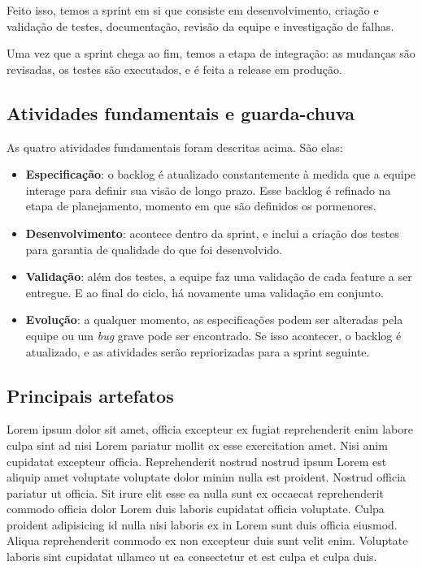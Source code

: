 \documentclass[12pt]{article}
\begin{document}
Feito isso, temos a sprint em si que consiste em desenvolvimento, criação e validação de testes, documentação, revisão da equipe e investigação de falhas.

Uma vez que a sprint chega ao fim, temos a etapa de integração: as mudanças são revisadas, os testes são executados, e é feita a release em produção.

\subsection*{Atividades fundamentais e guarda-chuva}

As quatro atividades fundamentais foram descritas acima. São elas:

\begin{itemize}
	\item \textbf{Especificação}: o backlog é atualizado constantemente à medida que a equipe interage para definir sua visão de longo prazo. Esse backlog é refinado na etapa de planejamento, momento em que são definidos os pormenores.
	\item \textbf{Desenvolvimento}: acontece dentro da sprint, e inclui a criação dos testes para garantia de qualidade do que foi desenvolvido.
	\item \textbf{Validação}: além dos testes, a equipe faz uma validação de cada feature a ser entregue. E ao final do ciclo, há novamente uma validação em conjunto.
	\item \textbf{Evolução}: a qualquer momento, as especificações podem ser alteradas pela equipe ou um \textit{bug} grave pode ser encontrado. Se isso acontecer, o backlog é atualizado, e as atividades serão repriorizadas para a sprint seguinte.
\end{itemize}

\subsection*{Principais artefatos}

Lorem ipsum dolor sit amet, officia excepteur ex fugiat reprehenderit enim labore culpa sint ad nisi Lorem pariatur mollit ex esse exercitation amet. Nisi anim cupidatat excepteur officia. Reprehenderit nostrud nostrud ipsum Lorem est aliquip amet voluptate voluptate dolor minim nulla est proident. Nostrud officia pariatur ut officia. Sit irure elit esse ea nulla sunt ex occaecat reprehenderit commodo officia dolor Lorem duis laboris cupidatat officia voluptate. Culpa proident adipisicing id nulla nisi laboris ex in Lorem sunt duis officia eiusmod. Aliqua reprehenderit commodo ex non excepteur duis sunt velit enim. Voluptate laboris sint cupidatat ullamco ut ea consectetur et est culpa et culpa duis.
\end{document}
